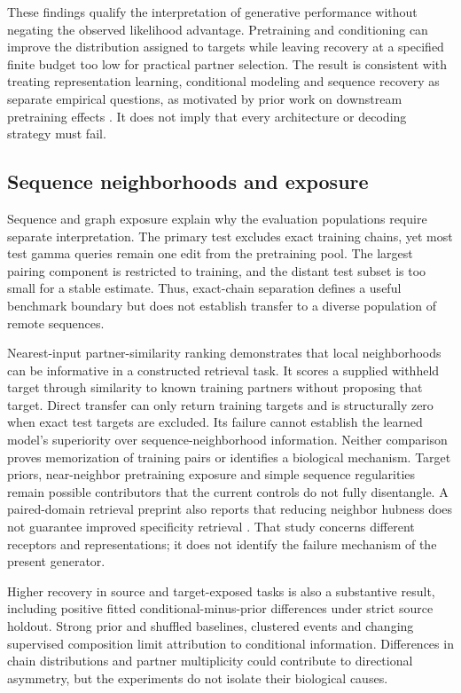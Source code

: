 \documentclass[a4paper,11pt]{article}
\begin{document}
These findings qualify the interpretation of generative performance without
negating the observed likelihood advantage. Pretraining and conditioning can
improve the distribution assigned to targets while leaving recovery at a
specified finite budget too low for practical partner selection.
The result is consistent with treating representation learning, conditional
modeling and sequence recovery as separate empirical questions, as motivated
by prior work on downstream pretraining effects \cite{landry2025}.
It does not imply that every architecture or decoding strategy must fail.

\subsection{Sequence neighborhoods and exposure}
Sequence and graph exposure explain why the evaluation populations require
separate interpretation. The primary test excludes exact training chains,
yet most test gamma queries remain one edit from the pretraining pool.
The largest pairing component is restricted to training, and the distant
test subset is too small for a stable estimate. Thus, exact-chain separation
defines a useful benchmark boundary but does not establish transfer to a
diverse population of remote sequences.

Nearest-input partner-similarity ranking demonstrates that local neighborhoods
can be informative in a constructed retrieval task. It scores a supplied
withheld target through similarity to known training partners without
proposing that target. Direct transfer can only return training targets and
is structurally zero when exact test targets are excluded.
Its failure cannot establish the learned model's superiority over
sequence-neighborhood information. Neither comparison proves memorization
of training pairs or identifies a biological mechanism. Target priors,
near-neighbor pretraining exposure and simple sequence regularities remain
possible contributors that the current controls do not fully disentangle.
A paired-domain retrieval preprint also reports that reducing neighbor
hubness does not guarantee improved specificity retrieval \cite{hubness}.
That study concerns different receptors and representations; it does not
identify the failure mechanism of the present generator.

Higher recovery in source and target-exposed tasks is also a substantive
result, including positive fitted conditional-minus-prior differences under
strict source holdout. Strong prior and shuffled baselines, clustered events
and changing supervised composition limit attribution to conditional
information. Differences in chain distributions and partner multiplicity
could contribute to directional asymmetry, but the experiments do not isolate
their biological causes.
\end{document}
